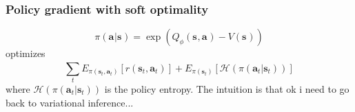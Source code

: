\documentclass{report}
\begin{document}
\subsubsection{Policy gradient with soft optimality}
\begin{equation}
		\pi (\bm{a}_{}| \bm{s}_{} ) = \exp \left( Q_{ \phi } (\bm{s}_{}, \bm{a}_{} ) - V (\bm{s}_{}) \right) 
\end{equation}
optimizes
\begin{equation}
\sum_{t}^{} E_{ \pi (\bm{s}_{t}, \bm{a}_{t} ) } \left[ r(\bm{s}_{t}, \bm{a}_{t} ) \right] + 
E_{ \pi (\bm{s}_{t}) } \left[  \mathcal{H} (\pi(\bm{a}_{t}| \bm{s}_{t} ))
\right] 
\end{equation}
where $ \mathcal{H} (\pi(\bm{a}_{t}| \bm{s}_{t} ))  $ is the policy entropy.
The intuition is that  
ok i need to go back to variational inference...
\end{document}
